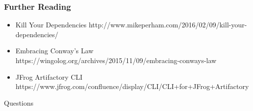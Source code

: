 \documentclass{beamer}
\begin{document}
\begin{frame}
  \frametitle{Further Reading}
  \begin{itemize}
  \item Kill Your Dependencies http://www.mikeperham.com/2016/02/09/kill-your-dependencies/
  \item Embracing Conway's Law https://wingolog.org/archives/2015/11/09/embracing-conways-law
  \item JFrog Artifactory CLI https://www.jfrog.com/confluence/display/CLI/CLI+for+JFrog+Artifactory
  \end{itemize}
\end{frame}
\begin{frame}
  \centerline{\color{blue}\Large Questions}
\end{frame}
\end{document}
